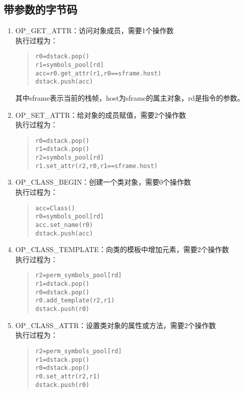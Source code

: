 \subsection{带参数的字节码}
\begin{enumerate}
\item OP\_GET\_ATTR：访问对象成员，需要1个操作数 \\
执行过程为：
\begin{quote}
\begin{verbatim}
r0=dstack.pop()
r1=symbols_pool[rd]
acc=r0.get_attr(r1,r0==sframe.host)
dstack.push(acc)
\end{verbatim}
\end{quote}
其中sframe表示当前的栈帧，host为sframe的属主对象，rd是指令的参数。

\item OP\_SET\_ATTR：给对象的成员赋值，需要2个操作数 \\
执行过程为：
\begin{quote}
\begin{verbatim}
r0=dstack.pop()
r1=dstack.pop()
r2=symbols_pool[rd]
r1.set_attr(r2,r0,r1==sframe.host)
\end{verbatim}
\end{quote}

\item OP\_CLASS\_BEGIN：创建一个类对象，需要0个操作数 \\
执行过程为：
\begin{quote}
\begin{verbatim}
acc=Class()
r0=symbols_pool[rd]
acc.set_name(r0)
dstack.push(acc)
\end{verbatim}
\end{quote}

\item OP\_CLASS\_TEMPLATE：向类的模板中增加元素，需要2个操作数 \\
执行过程为：
\begin{quote}
\begin{verbatim}
r2=perm_symbols_pool[rd]
r1=dstack.pop()
r0=dstack.pop()
r0.add_template(r2,r1)
dstack.push(r0)
\end{verbatim}
\end{quote}

\item OP\_CLASS\_ATTR：设置类对象的属性或方法，需要2个操作数 \\
执行过程为：
\begin{quote}
\begin{verbatim}
r2=perm_symbols_pool[rd]
r1=dstack.pop()
r0=dstack.pop()
r0.set_attr(r2,r1)
dstack.push(r0)
\end{verbatim}
\end{quote}


\end{enumerate}
